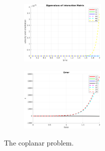 \documentclass[a4paper,12pt]{article}
\begin{document}
\begin{figure}[tb!]
\begin{subfigure}[b]{0.2\textwidth}
                \includegraphics[height=1.2in]{../results/Demo4-eignen.png}
                 \end{subfigure}%
         \begin{subfigure}[b]{0.32\textwidth}
                \centering
                \includegraphics[height=1.2in]{../results/Demo4-error.png}
                 \end{subfigure}%
         \caption{The coplanar problem.}
        \label{fig:demo4} 
\end{figure}
\end{document}
